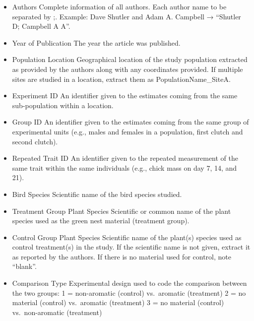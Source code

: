\documentclass[
  number,
  review,
  onecolumn]{elsarticle}
\begin{document}
\begin{figsupp}


\caption{\label{figsupp-variables}}

\end{figsupp}%

\begin{itemize}
\item
  Authors Complete information of all authors. Each author name to be
  separated by ;. Example: Dave Shutler and Adam A. Campbell → ``Shutler
  D; Campbell A A''.
\item
  Year of Publication The year the article was published.
\item
  Population Location Geographical location of the study population
  extracted as provided by the authors along with any coordinates
  provided. If multiple sites are studied in a location, extract them as
  PopulationName\_SiteA.
\item
  Experiment ID An identifier given to the estimates coming from the
  same sub-population within a location.
\item
  Group ID An identifier given to the estimates coming from the same
  group of experimental units (e.g., males and females in a population,
  first clutch and second clutch).
\item
  Repeated Trait ID An identifier given to the repeated measurement of
  the same trait within the same individuals (e.g., chick mass on day 7,
  14, and 21).
\item
  Bird Species Scientific name of the bird species studied.
\item
  Treatment Group Plant Species Scientific or common name of the plant
  species used as the green nest material (treatment group).
\item
  Control Group Plant Species Scientific name of the plant(s) species
  used as control treatment(s) in the study. If the scientific name is
  not given, extract it as reported by the authors. If there is no
  material used for control, note ``blank''.
\item
  Comparison Type Experimental design used to code the comparison
  between the two groups: 1 = non-aromatic (control) vs.~aromatic
  (treatment) 2 = no material (control) vs.~aromatic (treatment) 3 = no
  material (control) vs.~non-aromatic (treatment)

\end{itemize}
\end{document}
